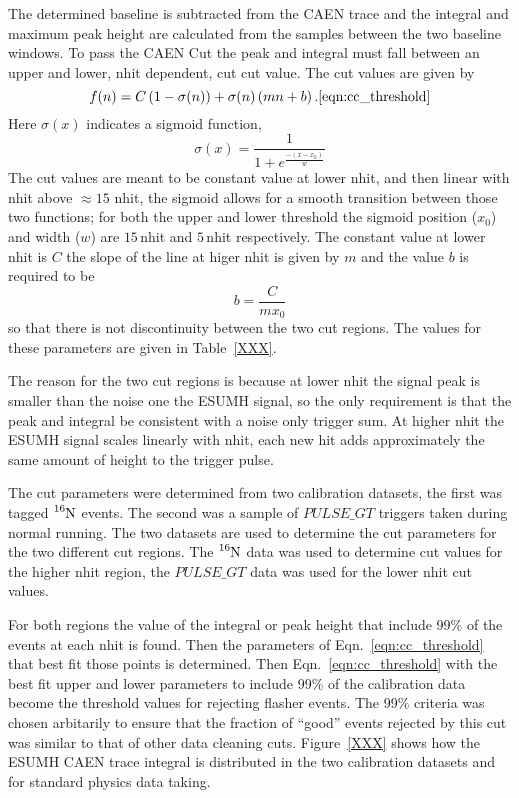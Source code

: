 The determined baseline is subtracted from the CAEN trace and the integral and maximum
peak height are calculated from the samples between the two baseline windows.
To pass the CAEN Cut the peak and integral must fall between an upper and lower, nhit dependent,
cut cut value.
The cut values are given by
\begin{equation}
    f(n) = C\left(1-\sigma(n)\right) + \sigma(n)\left(mn+b\right)\text{.}
    \ref{eqn:cc_threshold}
\end{equation}
Here $\sigma(x)$ indicates a sigmoid function,
\begin{equation}
    \sigma(x) = \frac{1}{1+e^{\frac{-(x-x_{0})}{w}}}
\end{equation}
The cut values are meant to be constant value at lower nhit, and then
linear with nhit above $\approx15$ nhit, the sigmoid allows for a smooth
transition between those two functions; for both the upper and lower threshold
the sigmoid position ($x_{0}$) and width ($w$) are $15$\,nhit and $5$\,nhit respectively.
The constant value at lower nhit is $C$ the slope of the line at higer nhit
is given by $m$ and the value $b$ is required to be
\begin{equation}
    b = \frac{C}{mx_{0}}
\end{equation}
so that there is not discontinuity between the two cut regions.
The values for these parameters are given in Table~\ref{XXX}.

The reason for the two cut regions is because at lower nhit the signal
peak is smaller than the noise one the ESUMH signal, so the only requirement
is that the peak and integral be consistent with a noise only trigger sum.
At higher nhit the ESUMH signal scales linearly with nhit, each new hit
adds approximately the same amount of height to the trigger pulse.

The cut parameters were determined from two calibration datasets, the first was
tagged $\ce{^{16}N}$
events. The second was a sample of $PULSE\_GT$ triggers taken during normal
running.
The two datasets are used to determine the cut parameters for the two
different cut regions.
The $\ce{^{16}N}$ data was used to determine cut values for the higher nhit
region, the $PULSE\_GT$ data was used for the lower nhit cut values.

For both regions the value of the integral or peak height that include
99\% of the events at each nhit is found. Then the parameters of
Eqn.~\ref{eqn:cc_threshold} that best fit those points is determined.
Then Eqn.~\ref{eqn:cc_threshold} with the best fit upper and lower
parameters to include 99\% of the calibration data become the threshold
values for rejecting flasher events.
The 99\% criteria was chosen arbitarily to ensure that the fraction of
``good'' events rejected by this cut was similar to that of other data
cleaning cuts.
Figure~\ref{XXX} shows how the ESUMH CAEN trace integral is distributed
in the two calibration datasets and for standard physics data taking.
